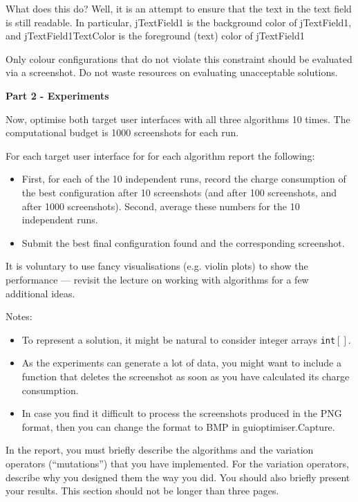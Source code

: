 \documentclass{pracs}
\begin{document}
What does this do? Well, it is an attempt to ensure that the text in the text field is still readable. In particular, jTextField1 is the background color of jTextField1, and jTextField1TextColor is the foreground (text) color of jTextField1

Only colour configurations that do not violate this constraint should be evaluated via a screenshot. Do not waste resources on evaluating unacceptable solutions.

\noindent\textbf{Part 2 - Experiments}

Now, optimise both target user interfaces with all three algorithms 10 times. The computational budget is 1000 screenshots for each run. 

For each target user interface for for each algorithm report the following:
\begin{itemize}
\item First, for each of the 10 independent runs, record the charge consumption of the best configuration after 10 screenshots (and after 100 screenshots, and after 1000 screenshots). Second, average these numbers for the 10 independent runs.
\item Submit the best final configuration found and the corresponding screenshot.
\end{itemize}

It is voluntary to use fancy visualisations (e.g. violin plots) to show the performance --- revisit the lecture on working with algorithms for a few additional ideas.

Notes:
\begin{itemize}
\item To represent a solution, it might be natural to consider integer arrays \texttt{int}$[]$.
\item As the experiments can generate a lot of data, you might want to include a function that deletes the screenshot as soon as you have calculated its charge consumption.
\item In case you find it difficult to process the screenshots produced in the PNG format, then you can change the format to BMP in guioptimiser.Capture.
\end{itemize}

In the report, you must briefly describe the algorithms and the variation operators (``mutations'') that you have implemented. For the variation operators, describe why you designed them the way you did. 
You should also briefly present your results. This section should not be longer than three pages.
\end{document}
